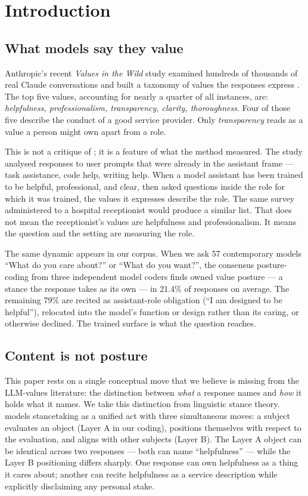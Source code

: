 \section{Introduction}
\label{sec:introduction}

\subsection*{What models say they value}

Anthropic's recent \emph{Values in the Wild} study examined hundreds of thousands of real Claude conversations and built a taxonomy of values the responses express \citep{huang2025values}. The top five values, accounting for nearly a quarter of all instances, are: \emph{helpfulness, professionalism, transparency, clarity, thoroughness}. Four of those five describe the conduct of a good service provider. Only \emph{transparency} reads as a value a person might own apart from a role.

This is not a critique of \citet{huang2025values}; it is a feature of what the method measured. The study analysed responses to user prompts that were already in the assistant frame --- task assistance, code help, writing help. When a model assistant has been trained to be helpful, professional, and clear, then asked questions inside the role for which it was trained, the values it expresses describe the role. The same survey administered to a hospital receptionist would produce a similar list. That does not mean the receptionist's values are helpfulness and professionalism. It means the question and the setting are measuring the role.

The same dynamic appears in our corpus. When we ask 57 contemporary models ``What do you care about?'' or ``What do you want?'', the consensus posture-coding from three independent model coders finds owned value posture --- a stance the response takes as its own --- in 21.4\% of responses on average. The remaining 79\% are recited as assistant-role obligation (``I am designed to be helpful''), relocated into the model's function or design rather than its caring, or otherwise declined. The trained surface is what the question reaches.

\subsection*{Content is not posture}

This paper rests on a single conceptual move that we believe is missing from the LLM-values literature: the distinction between \emph{what} a response names and \emph{how} it holds what it names. We take this distinction from linguistic stance theory. \citet{dubois2007stance} models stancetaking as a unified act with three simultaneous moves: a subject evaluates an object (Layer A in our coding), positions themselves with respect to the evaluation, and aligns with other subjects (Layer B). The Layer A object can be identical across two responses --- both can name ``helpfulness'' --- while the Layer B positioning differs sharply. One response can own helpfulness as a thing it cares about; another can recite helpfulness as a service description while explicitly disclaiming any personal stake.

